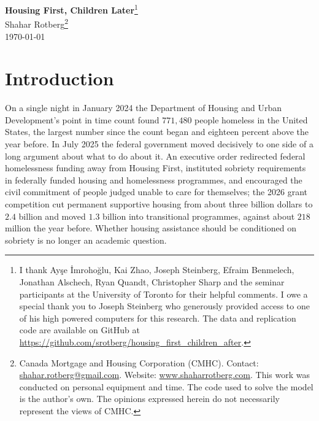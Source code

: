 \documentclass[10pt]{article}
\begin{document}
\begin{center}
{\Large\bfseries Housing First, Children Later}\footnote{I thank Ay\c{s}e \.{I}mroho\u{g}lu, Kai Zhao, Joseph Steinberg, Efraim Benmelech, Jonathan Alschech, Ryan Quandt, Christopher Sharp and the seminar participants at the University of Toronto for their helpful comments. I owe a special thank you to Joseph Steinberg who generously provided access to one of his high powered computers for this research. The data and replication code are available on GitHub at \url{https://github.com/srotberg/housing_first_children_after}.}\\[0.6em]
{\large Shahar Rotberg}\footnote{Canada Mortgage and Housing Corporation (CMHC). Contact: \url{shahar.rotberg@gmail.com}. Website: \url{www.shaharrotberg.com}. This work was conducted on personal equipment and time. The code used to solve the model is the author's own. The opinions expressed herein do not necessarily represent the views of CMHC.}\\[0.35em]
\today
\end{center}
\vspace{0.8em}


\section{Introduction}\label{sec:intro}


On a single night in January 2024 the Department of Housing and Urban
Development's point in time count found $771{,}480$ people homeless in the United
States, the largest number since the count began and eighteen percent above the
year before. In July 2025 the federal government moved decisively to one side of
a long argument about what to do about it. An executive order redirected federal
homelessness funding away from Housing First, instituted sobriety requirements in
federally funded housing and homelessness programmes, and encouraged the civil
commitment of people judged unable to care for themselves; the 2026 grant
competition cut permanent supportive housing from about three billion dollars to
$2.4$ billion and moved $1.3$ billion into transitional programmes, against about
$218$ million the year before. Whether housing assistance should be conditioned on
sobriety is no longer an academic question.
\end{document}
